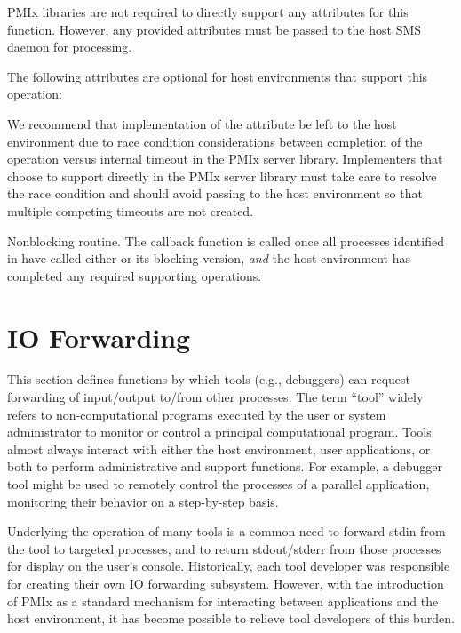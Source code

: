 \reqattrstart
\ac{PMIx} libraries are not required to directly support any attributes for this function. However, any provided attributes must be passed to the host \ac{SMS} daemon for processing.

\reqattrend

\optattrstart
The following attributes are optional for host environments that support this operation:


\optattrend

\adviceimplstart
We recommend that implementation of the  attribute be left to the host environment due to race condition considerations between completion of the operation versus internal timeout in the \ac{PMIx} server library. Implementers that choose to support  directly in the \ac{PMIx} server library must take care to resolve the race condition and should avoid passing  to the host environment so that multiple competing timeouts are not created.
\adviceimplend

\descr

Nonblocking  routine. The callback function is called once all processes identified in  have called either  or its blocking version, \textit{and} the host environment has completed any required supporting operations.


\section{IO Forwarding}
\label{chap:api_proc_mgmt:iof}

This section defines functions by which tools (e.g., debuggers) can request forwarding of input/output to/from other processes. The term ``tool'' widely refers to non-computational programs executed by the user or system administrator to monitor or control a principal computational program. Tools almost always interact with either the host environment, user applications, or both to perform administrative and support functions. For example, a debugger tool might be used to remotely control the processes of a parallel application, monitoring their behavior on a step-by-step basis.

Underlying the operation of many tools is a common need to forward stdin from the tool to targeted processes, and to return stdout/stderr from those processes for display on the user’s console. Historically, each tool developer was responsible for creating their own \ac{IO} forwarding subsystem. However, with the introduction of \ac{PMIx} as a standard mechanism for interacting between applications and the host environment, it has become possible to relieve tool developers of this burden.

